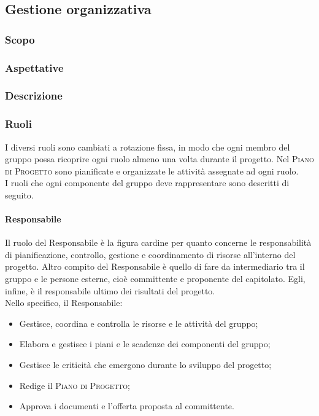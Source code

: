 \documentclass[../norme-di-progetto.tex]{subfiles}
\begin{document}
\subsection{Gestione organizzativa}
\subsubsection{Scopo}

\subsubsection{Aspettative}

\subsubsection{Descrizione}

\subsubsection{Ruoli}
I diversi ruoli sono cambiati a rotazione fissa, in modo che ogni membro del gruppo possa ricoprire ogni ruolo almeno una volta durante il progetto. Nel \textsc{Piano di Progetto} sono pianificate e organizzate le attività assegnate ad ogni ruolo. \\
I ruoli che ogni componente del gruppo deve rappresentare sono descritti di seguito.
\paragraph{Responsabile}
Il ruolo del Responsabile è la figura cardine per quanto concerne le responsabilità di pianificazione, controllo, gestione e coordinamento di risorse all'interno del progetto. Altro compito del Responsabile è quello di fare da intermediario tra il gruppo e le persone esterne, cioè committente e proponente del capitolato. Egli, infine, è il responsabile ultimo dei risultati del progetto. \\
Nello specifico, il Responsabile:
\begin{itemize}
  \item Gestisce, coordina e controlla le risorse e le attività del gruppo;
  \item Elabora e gestisce i piani e le scadenze dei componenti del gruppo;
  \item Gestisce le criticità che emergono durante lo sviluppo del progetto;
  \item Redige il \textsc{Piano di Progetto};
  \item Approva i documenti e l'offerta proposta al committente.
\end{itemize}
\end{document}

